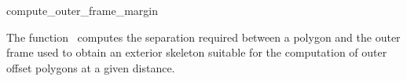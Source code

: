 

\begin{ccRefFunction}{compute_outer_frame_margin}


\ccDefinition

The function \ccRefName\ computes the separation required between a polygon and the outer frame used to obtain an exterior skeleton suitable for the computation of outer offset polygons at a given distance.



\end{ccRefFunction}

